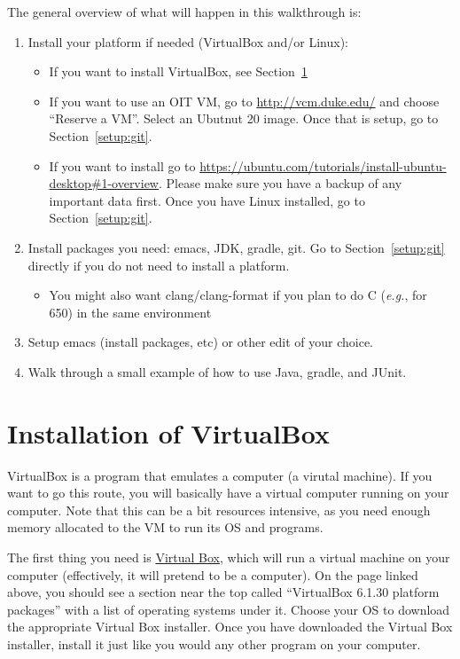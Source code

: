 \documentclass[12pt]{article}
\begin{document}
The general overview of what will happen in this walkthrough is:
\begin{enumerate}
\item Install your platform if needed (VirtualBox and/or Linux):
  \begin{itemize}
  \item If you want to install VirtualBox, see Section~\ref{label:VirtualBox}
  \item If you want to use an OIT VM, go to \url{http://vcm.duke.edu/}
    and choose ``Reserve a VM''. Select an Ubutnut 20 image.  Once that is setup, go to
    Section~\ref{setup:git}.
  \item If you want to install go to \url{https://ubuntu.com/tutorials/install-ubuntu-desktop#1-overview}.  Please
    make sure you have a backup of any important data first. Once you have Linux installed, go to
    Section~\ref{setup:git}.
  \end{itemize}
\item Install packages you need: emacs, JDK, gradle, git. Go to Section~\ref{setup:git} directly if you do not need to install a platform.
  \begin{itemize}
  \item You might also want clang/clang-format if you plan to do C (\emph{e.g.}, for 650) in the same environment
  \end{itemize}
\item Setup emacs (install packages, etc) or other edit of your choice.
\item Walk through a small example of how to use Java, gradle, and JUnit.
\end{enumerate}



\section{Installation of VirtualBox}
\label{label:VirtualBox}
VirtualBox is a program that emulates a computer (a virutal machine).  If you
want to go this route, you will basically have a virtual computer running on your computer.
Note that this can be a bit resources intensive, as you need enough memory allocated
to the VM to run its OS and programs.

The first thing you need is
\href{https://www.virtualbox.org/wiki/Downloads}{Virtual Box}, which
will run a virtual machine on your computer (effectively, it will
pretend to be a computer).  On the page linked above, you should see a
section near the top called ``VirtualBox 6.1.30 platform packages''
with a list of operating systems under it.  Choose your OS to download
the appropriate Virtual Box installer.  Once you have downloaded the
Virtual Box installer, install it just like you would any other
program on your computer.
\end{document}
